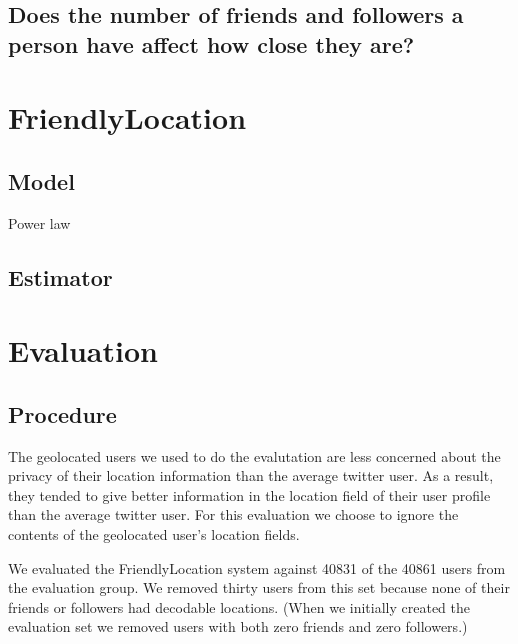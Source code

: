 \documentclass{sig-alternate}
\begin{document}
\subsection{Does the number of friends and followers a person have affect how close they are?}



\section{FriendlyLocation}
\subsection{Model}
\label{sec:model}

Power law
\begin{figure}
\centering
{}
\caption{}
\label{fig:EdgeTypesMdist}
\end{figure}
\subsection{Estimator}



\section{Evaluation}
\subsection{Procedure}
The geolocated users we used to do the evalutation are less concerned about the
privacy of their location information than the average twitter user.
As a result, they tended to give better information in the location field of
their user profile than the average twitter user.
For this evaluation we choose to ignore the contents of the geolocated user's
location fields.

We evaluated the FriendlyLocation system against 40831 of the 40861 users from the evaluation group.
We removed thirty users from this set because none of their friends or
followers had decodable locations.
(When we initially created the evaluation
set we removed users with both zero friends and zero followers.)
\end{document}

